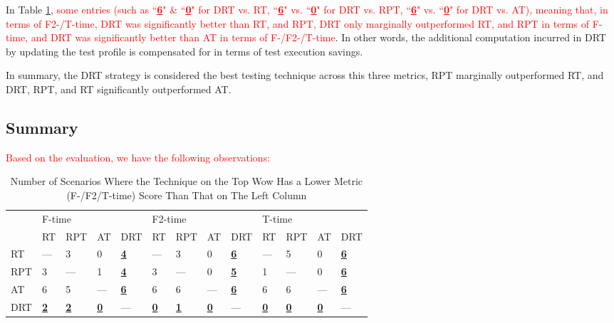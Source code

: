 \documentclass[10pt,journal,compsoc]{IEEEtran}
\begin{document}
In Table \ref{tableHlom:f/f2/t-time}, \textcolor{red}{some entries (such as ``\underline{\textbf{6}}" \& ``\underline{\textbf{0}}" for DRT vs. RT, ``\underline{\textbf{6}}" vs. ``\underline{\textbf{0}}" for DRT vs. RPT, ``\underline{\textbf{6}}" vs. ``\underline{\textbf{0}}" for DRT vs. AT), meaning that, in terms of F2-/T-time, DRT was significantly better than RT, and RPT, DRT only marginally outperformed RT, and RPT in terms of F-time, and DRT was significantly better than AT in terms of F-/F2-/T-time}.
In other words, the additional computation incurred in DRT by updating the test profile is compensated for in terms of test execution savings.

In summary, the DRT strategy is considered the best testing technique across this three metrics, RPT marginally outperformed RT, and DRT, RPT, and RT significantly outperformed AT.

\subsection{Summary}
\label{sec:summary}
\textcolor{red}{Based on the evaluation, we have the following observations:}

\begin{table}
  \caption{Number of Scenarios Where the Technique on the Top Wow Has a Lower Metric (F-/F2/T-time) Score Than That on The Left Column}
  \centering
  \label{tableHlom:f/f2/t-time}
  \begin{tabular}{lllllllllllll}  \toprule
  \multirow{2}{*}{}&\multicolumn{4}{l}{F-time}&\multicolumn{4}{l}{F2-time}&\multicolumn{4}{l}{T-time}\\\cmidrule(lr){2-5}\cmidrule(lr){6-9}
  \cmidrule(lr){10-13}
     &\!RT\! &\!RPT\! &\!AT\!&\!DRT\!                &\!RT\!&\!RPT\!&\!AT\!&\!DRT\!              &\!RT\!&\!RPT\!&\!AT\!&\!DRT\!\\\midrule
  RT & ---   &3       &0     &\underline{\textbf{4}}& ---  &3      &0&\underline{\textbf{6}} &--- &5  &0   &\underline{\textbf{6}}  \\
  RPT&3      & ---    &1     &\underline{\textbf{4}}&3     & ---   &0 &\underline{\textbf{5}}  &1 &---&0   &\underline{\textbf{6}} \\
  AT &6      &5       &---   &\underline{\textbf{6}}&6     &6      &--- &\underline{\textbf{6}}&6 &6 &---&\underline{\textbf{6}}    \\
  DRT&\underline{\textbf{2}}&\underline{\textbf{2}}&\underline{\textbf{0}}&---&\underline{\textbf{0}} &\underline{\textbf{1}}&\underline{\textbf{0}} &--- &\underline{\textbf{0}}  &\underline{\textbf{0}}&\underline{\textbf{0}} & ---  \\ \bottomrule
  \end{tabular}
\end{table}
\end{document}
